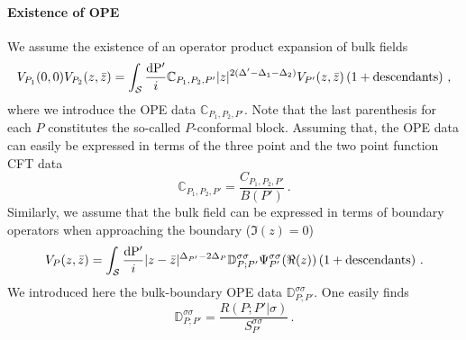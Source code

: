 \documentclass[a4paper]{article}
\begin{document}
\paragraph{Existence of OPE} We assume the existence of an operator product expansion of bulk fields
\begin{equation}\label{eq:OPE_convention}
  V_{P_1}(0,0)V_{P_2}(z,\bar{z}) = \int_{\mathcal{S}} \frac{\rm{d}P'}{i} \mathbb{C}_{P_1,P_2,P' }|z|^{2(\Delta'-\Delta_1-\Delta_2)}V_{P'}(z,\bar{z})\left(1+ \text{descendants}\right)\,,
\end{equation}
where we introduce the OPE data $\mathbb{C}_{P_1,P_2,P' }$. Note that the last parenthesis for each $P$ constitutes the so-called $P$-conformal block. Assuming that, the OPE data can easily be expressed in terms of the three point and the two point function CFT data
\begin{equation}
  \mathbb{C}_{P_1,P_2,P'} = \frac{C_{P_1,P_2,P'}}{B(P')}\,.
\end{equation}
Similarly, we assume that the bulk field can be expressed in terms of boundary operators when approaching the boundary ($\Im(z)=0$)
\begin{equation}\label{eq:expansion_boundary}
  V_{P}(z,\bar{z}) = \int_{\mathcal{S}} \frac{\rm{d}P'}{i} |z-\bar{z}|^{\Delta_{P'}-2\Delta_{P}}\mathbb{D}_{P ; P'}^{\sigma \sigma} \Psi_{P'}^{\sigma \sigma}(\Re(z))\left(1+ \text{descendants}\right)\,.
\end{equation}
We introduced here the bulk-boundary OPE data $\mathbb{D}_{P ; P'}^{\sigma \sigma}$. One easily finds
\begin{equation}
  \mathbb{D}_{P ; P'}^{\sigma \sigma} = \frac{R(P;P'|\sigma)}{S_{P'}^{\sigma \sigma}}\,.
\end{equation}
\end{document}

